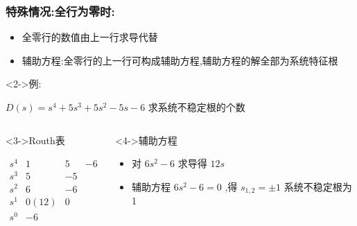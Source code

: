 \documentclass{beamer}
\begin{document}
\begin{frame}
\frametitle{特殊情况:全行为零时:}
\label{sec-4-2}

\begin{itemize}
\item 全零行的数值由上一行求导代替
\item 辅助方程:全零行的上一行可构成辅助方程,辅助方程的解全部为系统特征根
\end{itemize}
\begin{block}<2->{例:}
\label{sec-4-2-1}

$D(s)=s^{4}+5s^{3}+5s^{2}-5s-6$ 求系统不稳定根的个数
\end{block}
\begin{columns}
\begin{column}{0.35\textwidth}
\begin{block}<3->{Routh表}
\label{sec-4-2-2}

\[
\begin{matrix}
s^{4} &  1 &  5 & -6 \\
s^{3} &  5 & -5 \\
s^{2} &  6 & -6 \\
s^{1} &  0(12)  & 0 \\
s^{0} &  -6
\end{matrix}
\]
\end{block}
\end{column}
\begin{column}{0.65\textwidth}
\begin{block}<4->{辅助方程}
\label{sec-4-2-3}

\begin{itemize}
\item 对 $6s^{2}-6$ 求导得 $12s$
\item 辅助方程 $6s^2-6=0$ ,得 $s_{1,2}=\pm 1$ 系统不稳定根为1
\end{itemize}
\end{block}
\end{column}
\end{columns}
\end{frame}
\end{document}
